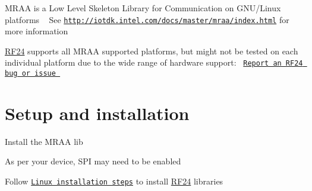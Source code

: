 M\+R\+AA is a Low Level Skeleton Library for Communication on G\+N\+U/\+Linux platforms ~\newline
 See \href{http://iotdk.intel.com/docs/master/mraa/index.html}{\tt http\+://iotdk.\+intel.\+com/docs/master/mraa/index.\+html} for more information

\hyperlink{classRF24}{R\+F24} supports all M\+R\+AA supported platforms, but might not be tested on each individual platform due to the wide range of hardware support\+:~\newline
 \href{https://github.com/TMRh20/RF24/issues}{\tt Report an R\+F24 bug or issue }\hypertarget{MRAA_Setup}{}\section{Setup and installation}\label{MRAA_Setup}

\begin{DoxyEnumerate}
\item Install the M\+R\+AA lib
\item As per your device, S\+PI may need to be enabled
\item Follow \href{Linux.html}{\tt Linux installation steps} to install \hyperlink{classRF24}{R\+F24} libraries
\end{DoxyEnumerate}

~\newline
~\newline
~\newline
 